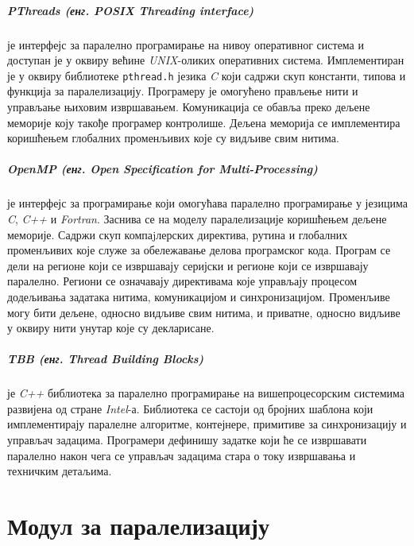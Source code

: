 \documentclass[12pt,oneside]{memoir}
\begin{document}
\paragraph{ PThreads (енг. POSIX Threading interface) \cite{pthread}}је интерфејс за паралелно програмирање на нивоу оперативног система и доступан је у оквиру већине \textit{UNIX}-оликих оперативних система. Имплементиран је у оквиру библиотеке \texttt{pthread.h} језика \textit{C} који садржи скуп константи, типова и функција за паралелизацију. Програмеру је омогућено прављење нити и управљање њиховим извршавањем. Комуникација се обавља преко дељене меморије коју такође програмер контролише. Дељена меморија се имплементира коришћењем глобалних променљивих које су видљиве свим нитима. 

\paragraph{OpenMP (енг. Open Specification for Multi-Processing) \cite{openmp}} је интерфејс за програмирање који омогућава паралелно програмирање у језицима \textit{C}, \textit{C++} и \textit{Fortran}. Заснива се на моделу паралелизације коришћењем дељене меморије. Садржи скуп компаjлерских директива, рутина и глобалних променљивих које служе за обележавање делова програмског кода. Програм се дели на регионе који се извршавају серијски и регионе који се извршавају паралелно. Региони се означавају директивама које управљају процесом додељивања задатака нитима, комуникацијом и синхронизацијом. Променљиве могу бити дељене, односно видљиве свим нитима, и приватне, односно видљиве у оквиру нити унутар које су декларисане.

\paragraph{TBB (енг. Thread Building Blocks) \cite{tbb}} је \textit{C++} библиотека за паралелно програмирање на вишепроцесорским системима развијена од стране \textit{Intel}-а. Библиотека се састоји од бројних шаблона који имплементирају паралелне алгоритме, контејнере, примитиве за синхронизацију и управљач задацима. Програмери дефинишу задатке који ће се извршавати паралелно након чега се управљач задацима стара о току извршавања и техничким детаљима.
  
\chapter{Модул за паралелизацију} \label{modul}
\end{document}
